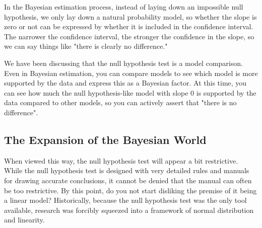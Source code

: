 \documentclass{ltjbook}
\begin{document}
In the Bayesian estimation process, instead of laying down an impossible null hypothesis, we only lay down a natural probability model, so whether the slope is zero or not can be expressed by whether it is included in the confidence interval. The narrower the confidence interval, the stronger the confidence in the slope, so we can say things like "there is clearly no difference."

We have been discussing that the null hypothesis test is a model comparison. Even in Bayesian estimation, you can compare models to see which model is more supported by the data and express this as a Bayesian factor. At this time, you can see how much the null hypothesis-like model with slope 0 is supported by the data compared to other models, so you can actively assert that "there is no difference".

\subsection{The Expansion of the Bayesian World}
When viewed this way, the null hypothesis test will appear a bit restrictive. While the null hypothesis test is designed with very detailed rules and manuals for drawing accurate conclusions, it cannot be denied that the manual can often be too restrictive. By this point, do you not start disliking the premise of it being a linear model? Historically, because the null hypothesis test was the only tool available, research was forcibly squeezed into a framework of normal distribution and linearity.
\end{document}
